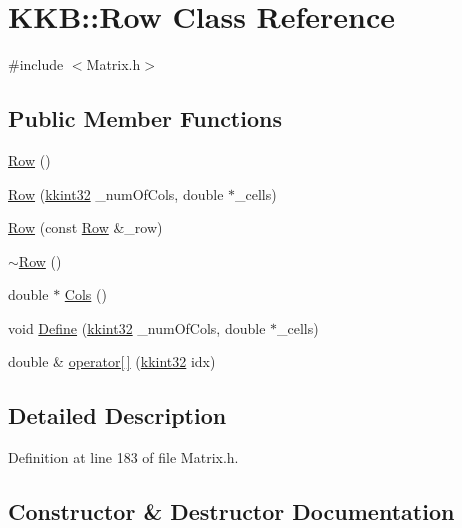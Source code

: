 \hypertarget{class_k_k_b_1_1_row}{}\section{K\+KB\+:\+:Row Class Reference}
\label{class_k_k_b_1_1_row}


{\ttfamily \#include $<$Matrix.\+h$>$}

\subsection*{Public Member Functions}
\begin{DoxyCompactItemize}
\item 
\hyperlink{class_k_k_b_1_1_row_a5cca50abc389396e26ec68cbd3fb6596}{Row} ()
\item 
\hyperlink{class_k_k_b_1_1_row_a4e40e9d21c650688d49b7abe9e16f723}{Row} (\hyperlink{namespace_k_k_b_a8fa4952cc84fda1de4bec1fbdd8d5b1b}{kkint32} \+\_\+num\+Of\+Cols, double $\ast$\+\_\+cells)
\item 
\hyperlink{class_k_k_b_1_1_row_a202c03cb0308b8db81690adec89afb92}{Row} (const \hyperlink{class_k_k_b_1_1_row}{Row} \&\+\_\+row)
\item 
\hyperlink{class_k_k_b_1_1_row_a8cc0869c91dc94ee595069309ba15690}{$\sim$\+Row} ()
\item 
double $\ast$ \hyperlink{class_k_k_b_1_1_row_a8a38915fb0f08e6ec02cbc29ed134049}{Cols} ()
\item 
void \hyperlink{class_k_k_b_1_1_row_ae6417fe28dbc6532f63b027c9ec4419a}{Define} (\hyperlink{namespace_k_k_b_a8fa4952cc84fda1de4bec1fbdd8d5b1b}{kkint32} \+\_\+num\+Of\+Cols, double $\ast$\+\_\+cells)
\item 
double \& \hyperlink{class_k_k_b_1_1_row_a7f8b72738992682713cb1f232ac94da3}{operator\mbox{[}$\,$\mbox{]}} (\hyperlink{namespace_k_k_b_a8fa4952cc84fda1de4bec1fbdd8d5b1b}{kkint32} idx)
\end{DoxyCompactItemize}


\subsection{Detailed Description}


Definition at line 183 of file Matrix.\+h.



\subsection{Constructor \& Destructor Documentation}
